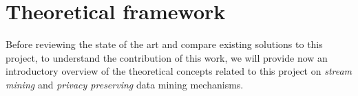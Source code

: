 \chapter{Theoretical framework} %
\label{Chapter2TheoreticalFramework} %


Before reviewing the state of the art and compare existing solutions to this project, to understand the contribution of this work, we will provide now an introductory overview of the theoretical concepts related to this project on \textit{stream mining} and \textit{privacy preserving} data mining mechanisms.




